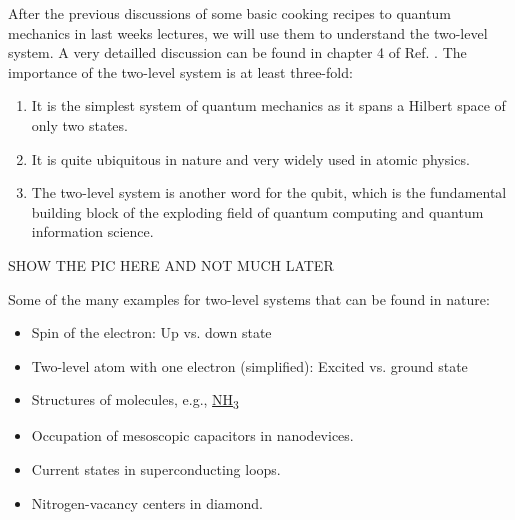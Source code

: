 After the previous discussions of some basic cooking recipes to quantum mechanics in last weeks lectures, we will use them to understand the two-level system. A very detailled discussion can be found in chapter 4 of Ref. \cite{1}. The importance of the two-level system is at least three-fold:
\begin{enumerate}
\item It is the simplest system of quantum mechanics as it spans a Hilbert space of only two states.
\item It is quite ubiquitous in nature and very widely used in atomic physics.
\item The two-level system is another word for the qubit, which is the fundamental building block of the exploding field of quantum computing and quantum information science.
\end{enumerate}


SHOW THE PIC HERE AND NOT MUCH LATER

Some of the many examples for two-level systems that can be found in nature:
\begin{itemize}
	\item Spin of the electron: Up vs. down state
	\item Two-level atom with one electron (simplified): Excited vs. ground state
	\item Structures of molecules, e.g., \hyperref[fig:twostate]{NH\textsubscript{3}}
	\item Occupation of mesoscopic capacitors in nanodevices.
	\item Current states in superconducting loops.
	\item Nitrogen-vacancy centers in diamond.
\end{itemize}